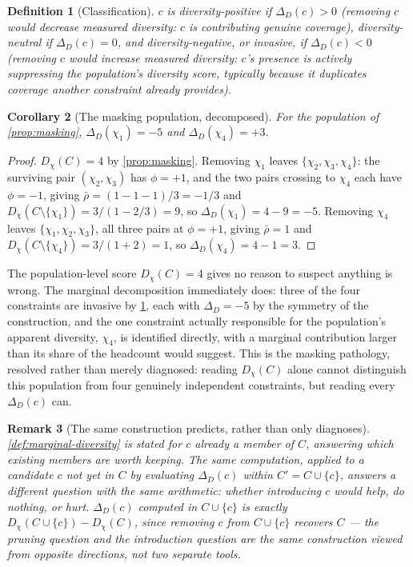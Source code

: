 \documentclass[12pt]{report}
\newtheorem{definition}{Definition}[section]
\newtheorem{corollary}[definition]{Corollary}
\newtheorem{remark}[definition]{Remark}
\begin{document}
\begin{definition}[Classification]
\label{def:diversity-classification}
$c$ is \emph{diversity-positive} if $\Delta_D(c) > 0$ (removing $c$
would decrease measured diversity: $c$ is contributing genuine
coverage), \emph{diversity-neutral} if $\Delta_D(c) = 0$, and
\emph{diversity-negative}, or \emph{invasive}, if $\Delta_D(c) < 0$
(removing $c$ would increase measured diversity: $c$'s presence is
actively suppressing the population's diversity score, typically
because it duplicates coverage another constraint already provides).
\end{definition}

\begin{corollary}[The masking population, decomposed]
\label{cor:masking-decomposed}
For the population of \cref{prop:masking}, $\Delta_D(\chi_1) = -5$ and
$\Delta_D(\chi_4) = +3$.
\end{corollary}

\begin{proof}
$D_\chi(C) = 4$ by \cref{prop:masking}. Removing $\chi_1$ leaves
$\{\chi_2,\chi_3,\chi_4\}$: the surviving pair $(\chi_2,\chi_3)$ has
$\phi = +1$, and the two pairs crossing to $\chi_4$ each have $\phi =
-1$, giving $\bar\rho = (1 - 1 - 1)/3 = -1/3$ and $D_\chi(C \setminus
\{\chi_1\}) = 3/(1 - 2/3) = 9$, so $\Delta_D(\chi_1) = 4 - 9 = -5$.
Removing $\chi_4$ leaves $\{\chi_1,\chi_2,\chi_3\}$, all three pairs at
$\phi = +1$, giving $\bar\rho = 1$ and $D_\chi(C \setminus \{\chi_4\}) =
3/(1+2) = 1$, so $\Delta_D(\chi_4) = 4 - 1 = 3$.
\end{proof}

The population-level score $D_\chi(C) = 4$ gives no reason to suspect
anything is wrong. The marginal decomposition immediately does: three
of the four constraints are invasive by \cref{def:diversity-classification},
each with $\Delta_D = -5$ by the symmetry of the construction, and the
one constraint actually responsible for the population's apparent
diversity, $\chi_4$, is identified directly, with a marginal
contribution larger than its share of the headcount would suggest. This
is the masking pathology, resolved rather than merely diagnosed: reading
$D_\chi(C)$ alone cannot distinguish this population from four genuinely
independent constraints, but reading every $\Delta_D(c)$ can.

\begin{remark}[The same construction predicts, rather than only diagnoses]
\label{rem:invasive-prediction}
\cref{def:marginal-diversity} is stated for $c$ already a member of
$C$, answering which existing members are worth keeping. The same
computation, applied to a candidate $c$ not yet in $C$ by evaluating
$\Delta_D(c)$ within $C' = C \cup \{c\}$, answers a different question
with the same arithmetic: whether introducing $c$ would help, do
nothing, or hurt. $\Delta_D(c)$ computed in $C \cup \{c\}$ is exactly
$D_\chi(C \cup \{c\}) - D_\chi(C)$, since removing $c$ from $C \cup
\{c\}$ recovers $C$ --- the pruning question and the introduction
question are the same construction viewed from opposite directions,
not two separate tools.
\end{remark}
\end{document}
